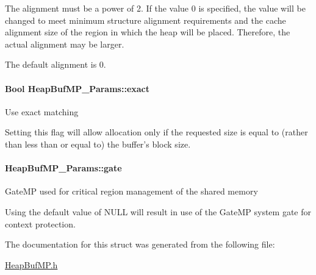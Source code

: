 The alignment must be a power of 2. If the value 0 is specified, the value will be changed to meet minimum structure alignment requirements and the cache alignment size of the region in which the heap will be placed. Therefore, the actual alignment may be larger.

The default alignment is 0. 
\paragraph[{exact}]{\setlength{\rightskip}{0pt plus 5cm}Bool {\bf HeapBufMP\_\-Params::exact}}\hfill\label{struct_heap_buf_m_p___params_a1ebbb52b6985282c23f534da4ac27eaa}
Use exact matching

Setting this flag will allow allocation only if the requested size is equal to (rather than less than or equal to) the buffer's block size. 
\paragraph[{gate}]{ {\bf HeapBufMP\_\-Params::gate}}\hfill\label{struct_heap_buf_m_p___params_a3b1ef95defb6c91953bd53050489644e}
GateMP used for critical region management of the shared memory

Using the default value of NULL will result in use of the GateMP system gate for context protection. 

The documentation for this struct was generated from the following file:\begin{DoxyCompactItemize}
\item 
\hyperlink{_heap_buf_m_p_8h}{HeapBufMP.h}\end{DoxyCompactItemize}
